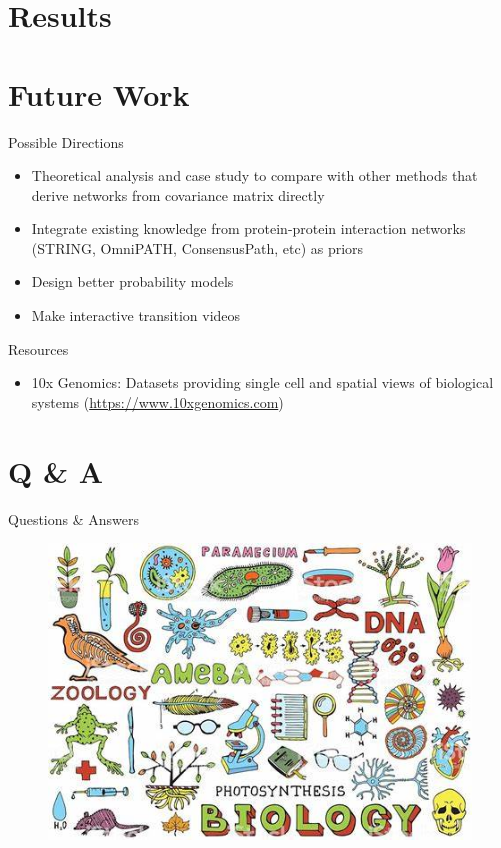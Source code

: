 \documentclass[handout,t]{beamer}
\begin{document}


\section{Results}






\section{Future Work}

\begin{frame}{Possible Directions}
\begin{itemize}
\item Theoretical analysis and case study to compare with other methods that derive networks from covariance matrix directly
\item Integrate existing knowledge from protein-protein interaction networks (STRING, OmniPATH, ConsensusPath, etc) as priors
\item Design better probability models
\item Make interactive transition videos
\end{itemize}
\end{frame}


\begin{frame}{Resources}
\begin{itemize}
\item 10x Genomics: Datasets providing single cell and spatial views of biological systems (\url{https://www.10xgenomics.com})
\end{itemize}
\end{frame}



\section{Q \& A}
\begin{frame}{Questions \& Answers}
\vspace{-0.3cm}
\begin{figure}
\includegraphics[width=0.85\columnwidth]{th.jpeg}
\end{figure}
\end{frame}
\end{document}
